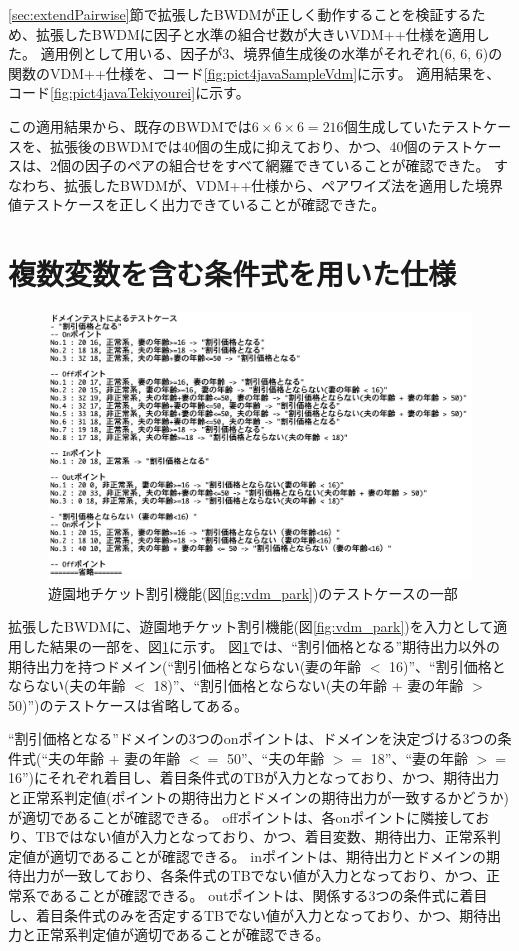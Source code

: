 \documentclass[uplatex, report, a4j, 10pt]{jsbook}
\begin{document}
\ref{sec:extendPairwise}節で拡張したBWDMが正しく動作することを検証するため、拡張したBWDMに因子と水準の組合せ数が大きいVDM++仕様を適用した。
適用例として用いる、因子が3、境界値生成後の水準がそれぞれ(6, 6, 6)の関数のVDM++仕様を、コード\ref{fig:pict4javaSampleVdm}に示す。
適用結果を、コード\ref{fig:pict4javaTekiyourei}に示す。

この適用結果から、既存のBWDMでは$6 \times 6 \times 6 = 216個$生成していたテストケースを、拡張後のBWDMでは40個の生成に抑えており、かつ、40個のテストケースは、2個の因子のペアの組合せをすべて網羅できていることが確認できた。
すなわち、拡張したBWDMが、VDM++仕様から、ペアワイズ法を適用した境界値テストケースを正しく出力できていることが確認できた。


\section{複数変数を含む条件式を用いた仕様}
\begin{figure}[tp]
  \centering
  \includegraphics[keepaspectratio, width=160mm]{figs/tekiyourei}
  \caption{遊園地チケット割引機能(図\ref{fig:vdm_park})のテストケースの一部}
  \label{fig:park_testcase}
\end{figure}

拡張したBWDMに、遊園地チケット割引機能(図\ref{fig:vdm_park})を入力として適用した結果の一部を、図\ref{fig:park_testcase}に示す。
図\ref{fig:park_testcase}では、“割引価格となる”期待出力以外の期待出力を持つドメイン(“割引価格とならない(妻の年齢 $<$ 16)”、“割引価格とならない(夫の年齢 $<$ 18)”、“割引価格とならない(夫の年齢 + 妻の年齢 $>$ 50)”)のテストケースは省略してある。

“割引価格となる”ドメインの3つのonポイントは、ドメインを決定づける3つの条件式(“夫の年齢 + 妻の年齢 $<=$ 50”、“夫の年齢 $>=$ 18”、“妻の年齢 $>=$ 16”)にそれぞれ着目し、着目条件式のTBが入力となっており、かつ、期待出力と正常系判定値(ポイントの期待出力とドメインの期待出力が一致するかどうか)が適切であることが確認できる。
offポイントは、各onポイントに隣接しており、TBではない値が入力となっており、かつ、着目変数、期待出力、正常系判定値が適切であることが確認できる。
inポイントは、期待出力とドメインの期待出力が一致しており、各条件式のTBでない値が入力となっており、かつ、正常系であることが確認できる。
outポイントは、関係する3つの条件式に着目し、着目条件式のみを否定するTBでない値が入力となっており、かつ、期待出力と正常系判定値が適切であることが確認できる。
\end{document}
